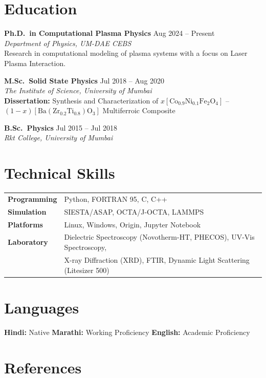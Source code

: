 \documentclass[a4paper,11pt]{article}
\newcommand{\cventry}[4]{%
  \noindent\textbf{#1} \hfill \textcolor{accent}{\small #2}\\
  \textit{\color{medgray}#3}\\
  #4\vspace{0.4em}
}
\newcommand{\cventryshort}[3]{%
  \noindent\textbf{#1} \hfill \textcolor{accent}{\small #2}\\
  \textit{\color{medgray}#3}\vspace{0.4em}
}
\begin{document}
\section{Education}

\cventry{Ph.D.\ in Computational Plasma Physics}{Aug 2024 -- Present}
{Department of Physics, UM-DAE CEBS}{%
Research in computational modeling of plasma systems with a focus on Laser Plasma Interaction.}

\cventry{M.Sc.\ Solid State Physics }{Jul 2018 -- Aug 2020}
{The Institute of Science, University of Mumbai}{%
\textbf{Dissertation:} Synthesis and Characterization of
$x[\text{Co}_{0.9}\text{Ni}_{0.1}\text{Fe}_2\text{O}_4]$ --
$(1-x)[\text{Ba}(\text{Zr}_{0.2}\text{Ti}_{0.8})\text{O}_3]$
Multiferroic Composite}

\cventryshort{B.Sc.\ Physics }{Jul 2015 -- Jul 2018}
{Rkt College, University of Mumbai}

\section{Technical Skills}

\begin{tabularx}{\textwidth}{@{} l X @{}}
  \textbf{Programming}   & Python, FORTRAN 95, C, C++ \\[3pt]
  \textbf{Simulation}     & SIESTA/ASAP, OCTA/J-OCTA, LAMMPS \\[3pt]
  \textbf{Platforms}       & Linux, Windows, Origin, Jupyter Notebook \\[3pt]
  \textbf{Laboratory}     & Dielectric Spectroscopy (Novotherm-HT, PHECOS), UV-Vis Spectroscopy, \\
                           & X-ray Diffraction (XRD), FTIR, Dynamic Light Scattering (Litesizer 500) \\
\end{tabularx}

\section{Languages}

\noindent
\textbf{Hindi:} Native \quad\textbar\quad
\textbf{Marathi:} Working Proficiency \quad\textbar\quad
\textbf{English:} Academic Proficiency

\section{References}
\end{document}

